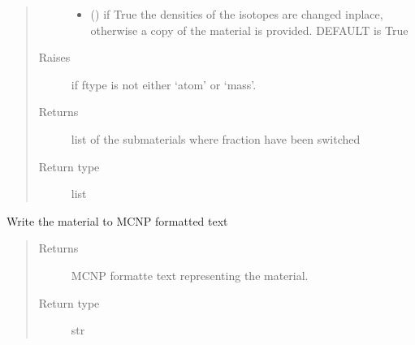 \documentclass[letterpaper,10pt,english]{sphinxmanual}
\begin{document}
\begin{fulllineitems}
\begin{fulllineitems}
\begin{quote}
\begin{description}
\begin{itemize}
\item {} 
\sphinxAtStartPar
{} () \textendash{} if True the densities of the isotopes are changed inplace,
otherwise a copy of the material is provided. DEFAULT is True

\end{itemize}

\item[{Raises}] \leavevmode
\sphinxAtStartPar
{} \textendash{} if ftype is not either ‘atom’ or ‘mass’.

\item[{Returns}] \leavevmode
\sphinxAtStartPar
{} \textendash{} list of the submaterials where fraction have been switched

\item[{Return type}] \leavevmode
\sphinxAtStartPar
list

\end{description}\end{quote}

\end{fulllineitems}


\begin{fulllineitems}
\label{\detokenize{api/inputgeneration:matreader.Material.to_text}}
\sphinxAtStartPar
Write the material to MCNP formatted text
\begin{quote}\begin{description}
\item[{Returns}] \leavevmode
\sphinxAtStartPar
MCNP formatte text representing the material.

\item[{Return type}] \leavevmode
\sphinxAtStartPar
str

\end{description}\end{quote}

\end{fulllineitems}



\end{fulllineitems}
\end{document}
